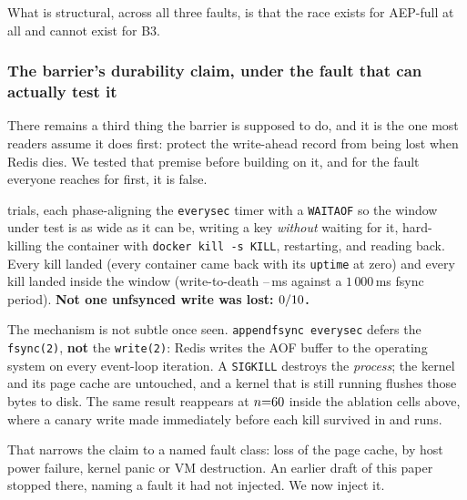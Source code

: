 What is structural, across all three faults, is that the race exists for
AEP-full at all and cannot exist for B3.

\subsubsection{The barrier's durability claim, under the fault that can
actually test it}
\label{sec:eval-durability}

There remains a third thing the barrier is supposed to do, and it is the one
most readers assume it does first: protect the write-ahead record from being
lost when Redis dies. We tested that premise before building on it,
and for the fault everyone reaches for first, it is false.

\ProcessKillTrials{} trials, each phase-aligning the \texttt{everysec} timer
with a \texttt{WAITAOF} so the window under test is as wide as it can be,
writing a key \emph{without} waiting for it, hard-killing the container with
\texttt{docker kill -s KILL}, restarting, and reading back. Every kill landed
(every container came back with its \texttt{uptime} at zero) and every kill
landed inside the window (write-to-death
\ProcessKillWindowMin{}--\ProcessKillWindowMax{}\,ms against a $1\,000$\,ms
fsync period).
\textbf{Not one unfsynced write was lost: $0/10{}$.}

The mechanism is not subtle once seen. \texttt{appendfsync everysec} defers the
\texttt{fsync(2)}, \textbf{not} the \texttt{write(2)}: Redis writes the AOF
buffer to the operating system on every event-loop iteration. A
\texttt{SIGKILL} destroys the \emph{process}; the kernel and its page cache are
untouched, and a kernel that is still running flushes those bytes to disk. The
same result reappears at $n{=}60{}$ inside the ablation cells above, where a
canary write made immediately before each kill survived in \AepKillCanary{} and
\BthreeKillCanary{} runs.

That narrows the claim to a named fault class: loss of the page cache, by
host power failure, kernel panic or VM destruction. An earlier draft of this
paper stopped there, naming a fault it had not injected. We now inject it.

